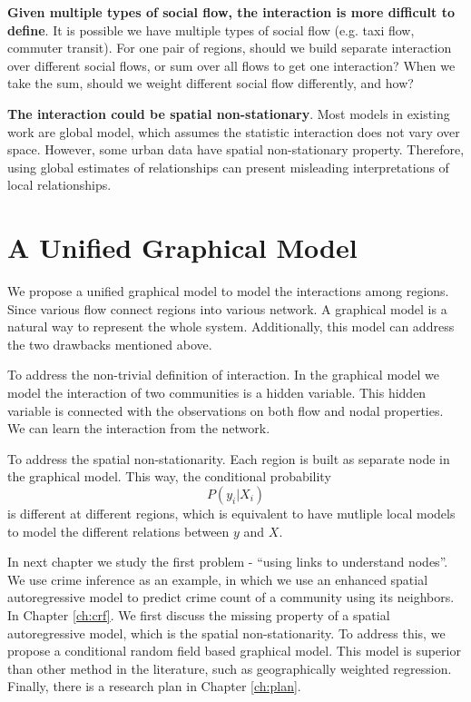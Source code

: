 \textbf{Given multiple types of social flow, the interaction is more difficult to define}. It is possible we have multiple types of social flow (e.g. taxi flow, commuter transit). For one pair of regions, should we build separate interaction over different social flows, or sum over all flows to get one interaction? When we take the sum, should we weight different social flow differently, and how?


\textbf{The interaction could be spatial non-stationary}. Most models in existing work are global model, which assumes the statistic interaction does not vary over space. However, some urban data have spatial non-stationary property. Therefore, using global estimates of relationships can present misleading interpretations of local relationships.





\section{A Unified Graphical Model}

We propose a unified graphical model to model the interactions among regions. Since various flow connect regions into various network. A graphical model is a natural way to represent the whole system. Additionally, this model can address the two drawbacks mentioned above.

To address the non-trivial definition of interaction. In the graphical model we model the interaction of two communities is a hidden variable. This hidden variable is connected with the observations on both flow and nodal properties. We can learn the interaction from the network.

To address the spatial non-stationarity. Each region is built as separate node in the graphical model. This way, the conditional probability 
\[ P(y_i | X_i) \]
is different at different regions, which is equivalent to have mutliple local models to model the different relations between $y$ and $X$.





In next chapter we study the first problem - ``using links to understand nodes''. We use crime inference as an example, in which we use an enhanced spatial autoregressive model to predict crime count of a community using its neighbors. In Chapter \ref{ch:crf}. We first discuss the missing property of a spatial autoregressive model, which is the spatial non-stationarity. To address this, we propose a conditional random field based  graphical model. This model is superior than other method in the literature, such as geographically weighted regression. Finally, there is a research plan in Chapter \ref{ch:plan}.



